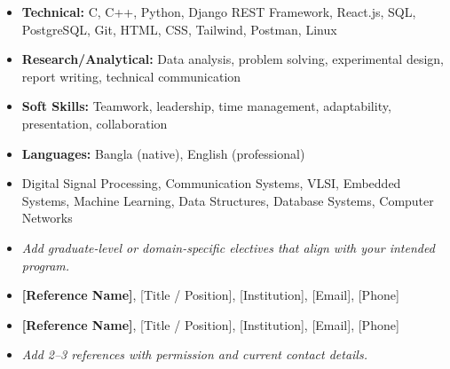 \begin{itemize}
  \item \textbf{Technical:} C, C++, Python, Django REST Framework, React.js, SQL, PostgreSQL, Git, HTML, CSS, Tailwind, Postman, Linux
  \item \textbf{Research/Analytical:} Data analysis, problem solving, experimental design, report writing, technical communication
  \item \textbf{Soft Skills:} Teamwork, leadership, time management, adaptability, presentation, collaboration
  \item \textbf{Languages:} Bangla (native), English (professional)
\end{itemize}

\begin{itemize}
  \item Digital Signal Processing, Communication Systems, VLSI, Embedded Systems, Machine Learning, Data Structures, Database Systems, Computer Networks
  \item \textit{Add graduate-level or domain-specific electives that align with your intended program.}
\end{itemize}

\begin{itemize}
  \item \textbf{[Reference Name]}, [Title / Position], [Institution], [Email], [Phone]
  \item \textbf{[Reference Name]}, [Title / Position], [Institution], [Email], [Phone]
  \item \textit{Add 2--3 references with permission and current contact details.}
\end{itemize}
